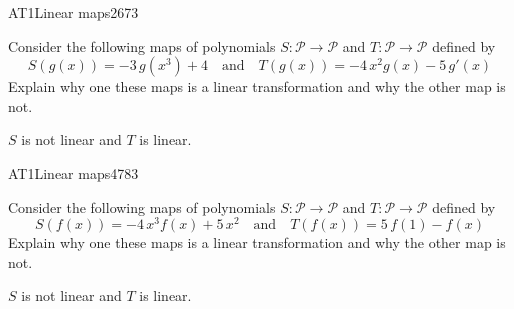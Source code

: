 \begin{exercise}{AT1}{Linear maps}{2673} 
\begin{exerciseStatement} 

 Consider the following maps of polynomials \(S:\mathcal{P}\rightarrow\mathcal{P}\) and \(T:\mathcal{P}\rightarrow\mathcal{P}\) defined by \[
            S(g(x))=
                    -3 \, g\left(x^{3}\right) + 4
                \hspace{1em} \text{and} \hspace{1em}
            T(g(x))=
                    -4 \, x^{2} g\left(x\right) - 5 \, g'\left(x\right)
        \] Explain why one these maps is a linear transformation and why the other map is not. 

 \end{exerciseStatement}
 \begin{exerciseAnswer} 

\(S\) is not linear and \(T\) is linear.

 \end{exerciseAnswer}
 \end{exercise}


\begin{exercise}{AT1}{Linear maps}{4783} 
\begin{exerciseStatement} 

 Consider the following maps of polynomials \(S:\mathcal{P}\rightarrow\mathcal{P}\) and \(T:\mathcal{P}\rightarrow\mathcal{P}\) defined by \[
            S(f(x))=
                    -4 \, x^{3} f\left(x\right) + 5 \, x^{2}
                \hspace{1em} \text{and} \hspace{1em}
            T(f(x))=
                    5 \, f\left(1\right) - f\left(x\right)
        \] Explain why one these maps is a linear transformation and why the other map is not. 

 \end{exerciseStatement}
 \begin{exerciseAnswer} 

\(S\) is not linear and \(T\) is linear.

 \end{exerciseAnswer}
 \end{exercise}


